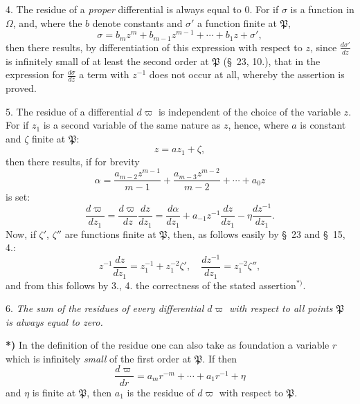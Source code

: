 \documentclass{article}
\begin{document}
4. The residue of a \emph{proper} differential is always equal to 0. For if $\sigma$ is a function in $\Omega$, and, where the $b$ denote constants and $\sigma'$ a function finite at $\mathfrak{P}$,
\[ \sigma = b_{m}z^{m}+b_{m-1}z^{m-1}+\cdots+b_{1}z+\sigma', \]
then there results, by differentiation of this expression with respect to $z$, since $\frac{d\sigma'}{dz}$ is infinitely small of at least the second order at $\mathfrak{P}$ (§~23, 10.), that in the expression for $\frac{d\sigma}{dz}$ a term with $z^{-1}$ does not occur at all, whereby the assertion is proved.

5. The residue of a differential $d\varpi$ is independent of the choice of the variable $z$. For if $z_{1}$ is a second variable of the same nature as $z$, hence, where $a$ is constant and $\zeta$ finite at $\mathfrak{P}$:
\[ z = az_{1}+\zeta, \tag{2.} \]
then there results, if for brevity
\[ \alpha = \frac{a_{m-2}z^{m-1}}{m-1}+\frac{a_{m-3}z^{m-2}}{m-2}+\cdots+a_{0}z \]
is set:
\[ \frac{d\varpi}{dz_{1}} = \frac{d\varpi}{dz}\frac{dz}{dz_{1}} = \frac{d\alpha}{dz_{1}}+a_{-1}z^{-1}\frac{dz}{dz_{1}}-\eta\frac{dz^{-1}}{dz_{1}}. \]
Now, if $\zeta'$, $\zeta''$ are functions finite at $\mathfrak{P}$, then, as follows easily by §~23 and §~15, 4.:
\[ z^{-1}\frac{dz}{dz_{1}} = z_{1}^{-1}+z_{1}^{-2}\zeta', \quad \frac{dz^{-1}}{dz_{1}} = z_{1}^{-2}\zeta'', \]
and from this follows by 3., 4. the correctness of the stated assertion${}^{*)}$.

6. \emph{The sum of the residues of every differential $d\varpi$ with respect to all points $\mathfrak{P}$ is always equal to zero.}

\textbf{*)} In the definition of the residue one can also take as foundation a variable $r$ which is infinitely \emph{small} of the first order at $\mathfrak{P}$. If then
\[ \frac{d\varpi}{dr} = a_{m}r^{-m}+\cdots+a_{1}r^{-1}+\eta \]
and $\eta$ is finite at $\mathfrak{P}$, then $a_{1}$ is the residue of $d\varpi$ with respect to $\mathfrak{P}$.

\end{document}
